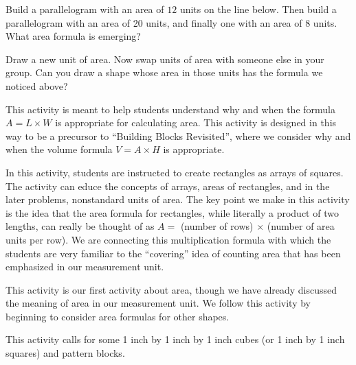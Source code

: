 \documentclass[nooutcomes]{ximera}
\begin{document}
\begin{problem}
Build a parallelogram with an area of $12$ units on the line below.  Then build a parallelogram with an area of 20 units, and finally one with an area of 8 units.  What area formula is emerging?

\vspace{6.5cm}

\end{problem}

\begin{problem}
Draw a new unit of area.  Now swap units of area with someone else in your group.  Can you draw a shape whose area in those units has the formula we noticed above?

\end{problem}

\newpage
\begin{instructorNotes}
This activity is meant to help students understand why and when the formula $A = L \times W$ is appropriate for calculating area.  This activity is designed in this way to be a precursor to ``Building Blocks Revisited'', where we consider why and when the volume formula $V = A \times H$ is appropriate.  

In this activity, students are instructed to create rectangles as arrays of squares.  The activity can educe the concepts of arrays, areas of rectangles, and in the later problems, nonstandard units of area.  The key point we make in this activity is the idea that the area formula for rectangles, while literally a product of two lengths, can really be thought of as $A = $ (number of rows) $\times$ (number of area units per row).  We are connecting this multiplication formula with which the students are very familiar to the ``covering'' idea of counting area that has been emphasized in our measurement unit.

This activity is our first activity about area, though we have already discussed the meaning of area in our measurement unit.  We follow this activity by beginning to consider area formulas for other shapes.

This activity calls for some 1 inch by 1 inch by 1 inch cubes (or 1 inch by 1 inch squares) and pattern blocks.




\end{instructorNotes}
\end{document}
